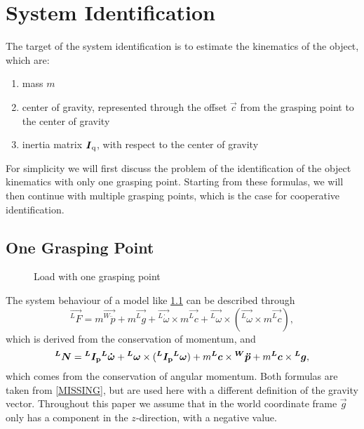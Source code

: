 

\chapter{System Identification}

\label{subsec:system_identification}
The target of the system identification is to estimate the kinematics of the object, which are:
\begin{enumerate}
	\item mass $m$
	\item center of gravity, represented through the offset $\vec c$ from the grasping point to the center of gravity
	\item inertia matrix $\boldsymbol{I}_{\mathrm{q}}$, with respect to the center of gravity
\end{enumerate}

For simplicity we will first discuss the problem of the identification of the object kinematics with only one grasping point. Starting from these formulas, we will then continue with multiple grasping points, which is the case for cooperative identification.

\section{One Grasping Point}

\begin{figure}
	\centering
	
	\caption{Load with one grasping point}
	\label{fig:load_one_grasping_point}
\end{figure}

The system behaviour of a model like \ref{fig:load_one_grasping_point} can be described through 
\begin{equation}
	\vec{^LF} = m \vec{^W\ddot{p}} + m \vec{^Lg} + \vec{^L\dot{\omega}} \times m \vec{^Lc} + \vec{^L\omega} \times (\vec{^L\omega} \times m \vec{^Lc}),
	\label{eq:force}
\end{equation}
which is derived from the conservation of momentum, and
\begin{equation}
	\boldsymbol{^LN} = \boldsymbol{^LI_{\mathrm{p}}} \boldsymbol{^L\dot{\omega}} + \boldsymbol{^L\omega} \times (\boldsymbol{^LI_{\mathrm{p}}} \boldsymbol{^L\omega}) + m \boldsymbol{^Lc} \times \boldsymbol{^W\ddot{p}} + m \boldsymbol{^Lc} \times \boldsymbol{^Lg},
	\label{eq:torque}
\end{equation}
which comes from the conservation of angular momentum. Both formulas are taken from \ref{MISSING}, but are used here with a different definition of the gravity vector. Throughout this paper we assume that in the world coordinate frame $\vec g$ only has a component in the $z$-direction, with a negative value.

